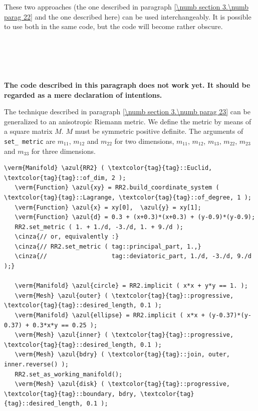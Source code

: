 These two approaches (the one described in paragraph \ref{\numb section 3.\numb parag 22} and
the one described here) can be used interchangeably.
It is possible to use both in the same code, but the code will become rather obscure.


\section{~~}\label{\numb section 3.\numb parag 24}

{\normalfont\bfseries The code described in this paragraph does not work yet.
It should be regarded as a mere declaration of intentions.}
\medskip

The technique described in paragraph \ref{\numb section 3.\numb parag 23} can be generalized to
an anisotropic Riemann metric.
We define the metric by means of a square matrix $M$.
$M$ must be symmetric positive definite.
The arguments of {\small\tt set\_\,metric} are $ m_{11} $, $ m_{12} $ and $ m_{22} $
for two dimensions,
$ m_{11} $, $ m_{12} $, $ m_{13} $, $ m_{22} $, $ m_{23} $ and $ m_{33} $ for three dimensions.

\begin{Verbatim}[commandchars=\\\{\},formatcom=\small\tt,frame=single,
   label=code not working,rulecolor=\color{coment},
   baselinestretch=0.94,framesep=2mm                                  ]
   \verm{Manifold} \azul{RR2} ( \textcolor{tag}{tag}::Euclid, \textcolor{tag}{tag}::of_dim, 2 );
   \verm{Function} \azul{xy} = RR2.build_coordinate_system ( \textcolor{tag}{tag}::Lagrange, \textcolor{tag}{tag}::of_degree, 1 );
   \verm{Function} \azul{x} = xy[0],  \azul{y} = xy[1];
   \verm{Function} \azul{d} = 0.3 + (x+0.3)*(x+0.3) + (y-0.9)*(y-0.9);
   RR2.set_metric ( 1. + 1./d, -3./d, 1. + 9./d );
   \cinza{// or, equivalently :}
   \cinza{// RR2.set_metric ( tag::principal_part, 1.,}
   \cinza{//                  tag::deviatoric_part, 1./d, -3./d, 9./d );}

   \verm{Manifold} \azul{circle} = RR2.implicit ( x*x + y*y == 1. );
   \verm{Mesh} \azul{outer} ( \textcolor{tag}{tag}::progressive, \textcolor{tag}{tag}::desired_length, 0.1 );
   \verm{Manifold} \azul{ellipse} = RR2.implicit ( x*x + (y-0.37)*(y-0.37) + 0.3*x*y == 0.25 );
   \verm{Mesh} \azul{inner} ( \textcolor{tag}{tag}::progressive, \textcolor{tag}{tag}::desired_length, 0.1 );
   \verm{Mesh} \azul{bdry} ( \textcolor{tag}{tag}::join, outer, inner.reverse() );
   RR2.set_as_working_manifold();
   \verm{Mesh} \azul{disk} ( \textcolor{tag}{tag}::progressive, \textcolor{tag}{tag}::boundary, bdry, \textcolor{tag}{tag}::desired_length, 0.1 );
\end{Verbatim}


